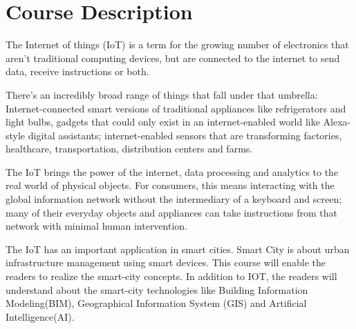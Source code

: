 \section*{Course Description}


\bigskip The Internet of things (IoT) is a term for the growing number of electronics that aren't traditional computing devices, but are connected to the internet to send data, receive instructions or both.

\bigskip There's an incredibly broad range of things that fall under that umbrella: Internet-connected smart versions of traditional appliances like refrigerators and light bulbs, gadgets that could only exist in an internet-enabled world like Alexa-style digital assistants; internet-enabled sensors that are transforming factories, healthcare, transportation, distribution centers and farms.

\bigskip The IoT brings the power of the internet, data processing and analytics to the real world of physical objects. For consumers, this means interacting with the global information network without the intermediary of a keyboard and screen; many of their everyday objects and appliances can take instructions from that network with minimal human intervention.

\bigskip The IoT has an important application in smart cities. Smart City is about urban infrastructure management using smart devices. This course will enable the readers to realize the smart-city concepts. In addition to IOT, the readers will understand about the smart-city technologies like Building Information Modeling(BIM), Geographical Information System (GIS) and Artificial Intelligence(AI).